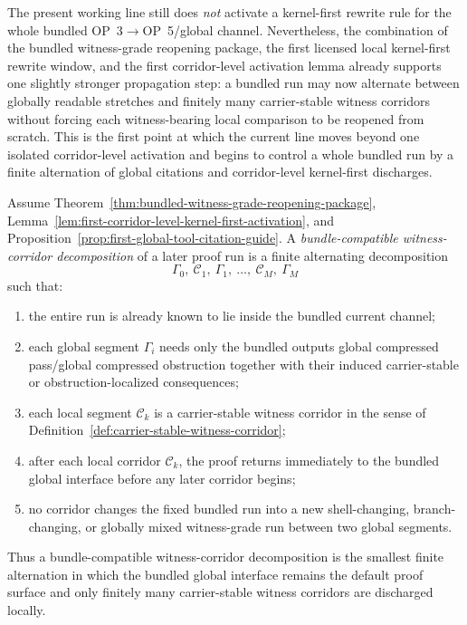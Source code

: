 \begin{remark}
\label{rem:status-of-the-first-corridor-to-bundle-propagation-step}
The present working line still does \emph{not} activate a kernel-first rewrite rule for the whole bundled OP~3$\to$OP~5/global channel. Nevertheless, the combination of the bundled witness-grade reopening package, the first licensed local kernel-first rewrite window, and the first corridor-level activation lemma already supports one slightly stronger propagation step: a bundled run may now alternate between globally readable stretches and finitely many carrier-stable witness corridors without forcing each witness-bearing local comparison to be reopened from scratch. This is the first point at which the current line moves beyond one isolated corridor-level activation and begins to control a whole bundled run by a finite alternation of global citations and corridor-level kernel-first discharges.
\end{remark}

\begin{definition}
\label{def:bundle-compatible-witness-corridor-decomposition}
Assume Theorem~\ref{thm:bundled-witness-grade-reopening-package}, Lemma~\ref{lem:first-corridor-level-kernel-first-activation}, and Proposition~\ref{prop:first-global-tool-citation-guide}. A \emph{bundle-compatible witness-corridor decomposition} of a later proof run is a finite alternating decomposition
\[
\Gamma_0,\ \mathcal C_1,\ \Gamma_1,\ \ldots,\ \mathcal C_M,\ \Gamma_M
\]
such that:
\begin{enumerate}[leftmargin=2em,label=(\roman*)]
\item the entire run is already known to lie inside the bundled current channel;
\item each global segment $\Gamma_i$ needs only the bundled outputs global compressed pass/global compressed obstruction together with their induced carrier-stable or obstruction-localized consequences;
\item each local segment $\mathcal C_k$ is a carrier-stable witness corridor in the sense of Definition~\ref{def:carrier-stable-witness-corridor};
\item after each local corridor $\mathcal C_k$, the proof returns immediately to the bundled global interface before any later corridor begins;
\item no corridor changes the fixed bundled run into a new shell-changing, branch-changing, or globally mixed witness-grade run between two global segments.
\end{enumerate}
Thus a bundle-compatible witness-corridor decomposition is the smallest finite alternation in which the bundled global interface remains the default proof surface and only finitely many carrier-stable witness corridors are discharged locally.
\end{definition}

